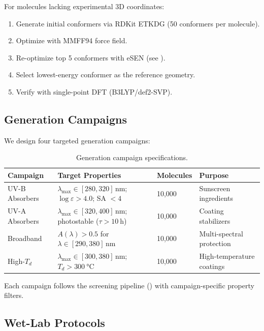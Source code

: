 \documentclass[12pt,a4paper]{article}
\begin{document}
For molecules lacking experimental 3D coordinates:
\begin{enumerate}
    \item Generate initial conformers via RDKit ETKDG (50 conformers per molecule).
    \item Optimize with MMFF94 force field.
    \item Re-optimize top 5 conformers with eSEN (see ).
    \item Select lowest-energy conformer as the reference geometry.
    \item Verify with single-point DFT (B3LYP/def2-SVP).
\end{enumerate}

\subsection{Generation Campaigns}\label{sec:campaigns}

We design four targeted generation campaigns:

\begin{table}[H]
\centering
\caption{Generation campaign specifications.}
\label{tab:campaigns}
\begin{tabular}{p{3cm}p{4cm}p{3cm}p{3cm}}
\toprule
\textbf{Campaign} & \textbf{Target Properties} & \textbf{Molecules} & \textbf{Purpose} \\
\midrule
UV-B Absorbers & $\lambda_{\max} \in [280, 320]$\,nm; $\log\varepsilon > 4.0$; SA $< 4$ & 10,000 & Sunscreen ingredients \\
\midrule
UV-A Absorbers & $\lambda_{\max} \in [320, 400]$\,nm; photostable ($\tau > \SI{10}{\hour}$) & 10,000 & Coating stabilizers \\
\midrule
Broadband & $A(\lambda) > 0.5$ for $\lambda \in [290, 380]$\,nm & 10,000 & Multi-spectral protection \\
\midrule
High-$T_d$ & $\lambda_{\max} \in [300, 380]$\,nm; $T_d > \SI{300}{\celsius}$ & 10,000 & High-temperature coatings \\
\bottomrule
\end{tabular}
\end{table}

Each campaign follows the screening pipeline () with campaign-specific property filters.

\subsection{Wet-Lab Protocols}\label{sec:wetlab}
\end{document}
